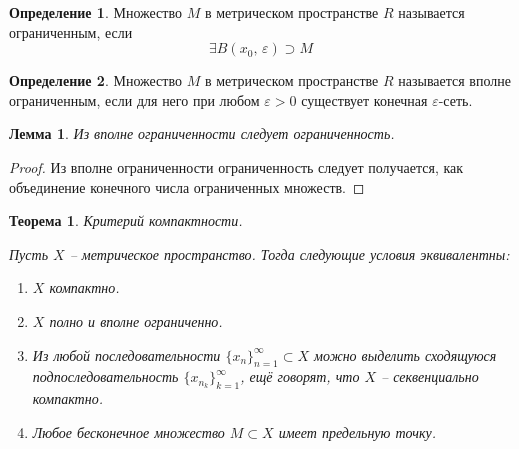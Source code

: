 \documentclass[a4paper,12pt]{article}
\theoremstyle{plain}
\newtheorem{theorem}{Теорема}[section]
\newtheorem{lemma}{Лемма}[section]
\theoremstyle{definition}
\newtheorem{definition}{Определение}[section]
\theoremstyle{remark}
\begin{document}
\begin{definition}
	Множество $M$ в метрическом пространстве $R$ называется ограниченным, если 
	\[
		\exists B(x_0,\, \varepsilon) \supset M
	\] 
\end{definition}

\begin{definition}
	Множество $M$ в метрическом пространстве $R$ называется вполне ограниченным, если для него при любом $\varepsilon > 0$ существует конечная $\varepsilon$-сеть.
\end{definition}

\begin{lemma}
	Из вполне ограниченности следует ограниченность.
\end{lemma}

\begin{proof}
	Из вполне ограниченности ограниченность следует получается, как объединение конечного числа ограниченных множеств.
\end{proof}

\begin{theorem}
	Критерий компактности.

	Пусть $X$ -- метрическое пространство. Тогда следующие условия эквивалентны:
	\begin{enumerate}
		\item $X$ компактно.
		\item $X$ полно и вполне ограниченно.
		\item Из любой последовательности $\{x_n\}_{n = 1}^\infty \subset X$ можно выделить сходящуюся подпоследовательность $\{x_{n_k}\}_{k = 1}^\infty$, ещё говорят, что $X$ -- секвенциально компактно.
		\item Любое бесконечное множество $M \subset X$ имеет предельную точку.
	\end{enumerate}
\end{theorem}
\end{document}
